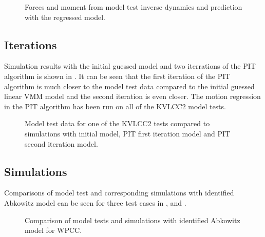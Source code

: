 \documentclass[review]{elsarticle}
\begin{document}
\begin{figure}[htbp]
\centering
\capstart

\noindent{}
\caption{Forces and moment from model test inverse dynamics and prediction with the regressed model.}\label{\detokenize{05.01_model_tests:force-prediction}}\end{figure}


\subsection{Iterations}
\label{\detokenize{05.01_model_tests:iterations}}
\sphinxAtStartPar
Simulation results with the initial guessed model and two iterrations of the PIT algorithm is shown in {\hyperref[\detokenize{05.01_model_tests:id10}]{}}.
It can be seen that the first iteration of the PIT algorithm is much closer to the model test data compared to the initial guessed linear VMM model and the second iteration is even closer. The motion regression in the PIT algorithm has been run on all of the KVLCC2 model tests.

\begin{figure}[htbp]
\centering
\capstart

\noindent{}
\caption{Model test data for one of the KVLCC2 tests compared to simulations with initial model, PIT first iteration model and PIT second iteration model.}\label{\detokenize{05.01_model_tests:id10}}\end{figure}


\subsection{Simulations}
\label{\detokenize{05.01_model_tests:simulations}}
\sphinxAtStartPar
Comparisons of model test and corresponding simulations with identified Abkowitz model can be seen for three test cases in {\hyperref[\detokenize{05.01_model_tests:wpcc}]{}}, {\hyperref[\detokenize{05.01_model_tests:lng}]{}} and {\hyperref[\detokenize{05.01_model_tests:kvlcc2-hsva}]{}}.

\begin{figure}[htbp]
\centering
\capstart

\noindent{}
\caption{Comparison of model tests and simulations with identified Abkowitz model for WPCC.}\label{\detokenize{05.01_model_tests:wpcc}}\end{figure}
\end{document}
